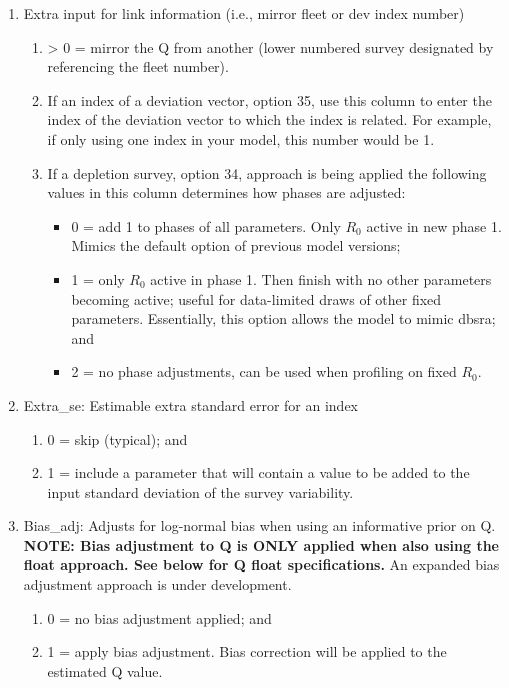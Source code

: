 \begin{enumerate}
\begin{enumerate}[label=(\alph*)]
	\end{enumerate}
	\item \hypertarget{link_info}{Extra input for link information (i.e., mirror fleet or dev index number)}
	\begin{enumerate}[label=(\alph*)]
		\item > 0 = mirror the Q from another (lower numbered survey designated by referencing the fleet number).
		\item If an index of a deviation vector, option 35, use this column to enter the index of the deviation vector to which the index is related. For example, if only using one index in your model, this number would be 1.
		\item If a depletion survey, option 34, approach is being applied the following values in this column determines how phases are adjusted:
		\begin{itemize}
			\item 0 = add 1 to phases of all parameters. Only $R_{0}$ active in new phase 1. Mimics the default option of previous model versions;
			\item 1 = only $R_{0}$ active in phase 1. Then finish with no other parameters becoming active; useful for data-limited draws of other fixed parameters. Essentially, this option allows the model to mimic \gls{dbsra}; and
			\item 2 = no phase adjustments, can be used when profiling on fixed $R_{0}$.
		\end{itemize}
	\end{enumerate}
	\item Extra\_se: Estimable extra standard error for an index
	\begin{enumerate}[label=(\alph*)]
		\item 0 = skip (typical); and
		\item 1 = include a parameter that will contain a value to be added to the input standard deviation of the survey variability.
	\end{enumerate}
	\item Bias\_adj: Adjusts for log-normal bias when using an informative prior on Q. \textbf{NOTE: Bias adjustment to Q is ONLY applied when also using the float approach. See below for Q float specifications.} An expanded bias adjustment approach is under development.
	\begin{enumerate}[label=(\alph*)]
		\item 0 = no bias adjustment applied; and
		\item 1 = apply bias adjustment. Bias correction will be applied to the estimated Q value.

\end{enumerate}
\end{enumerate}
